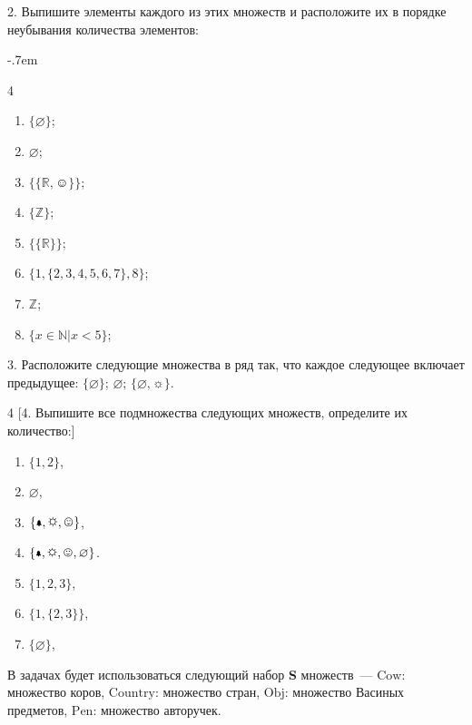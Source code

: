 \documentclass[a4paper,10pt]{article}
\begin{document}
2. Выпишите элементы каждого из этих множеств и расположите их в порядке неубывания количества элементов:\par\kern-.7em
\begin{multicols}{4}
	\begin{enumerate}[label=(\arabic*)\,]
		\item $\{\varnothing\}$;
		\item $\varnothing$;
		\item $\{\{\mathbb R, \smiley\}\}$;
		\item $\{\mathbb Z\}$;
		\item $\{\{\mathbb R\}\}$;
		\item $\{1,\{2,3,4,5,6,7\},8\}$;
		\item $\mathbb Z$;
		\item $\{x\in\mathbb N|x<5\}$;
	\end{enumerate}
\end{multicols}

3. Расположите следующие множества в ряд так, что каждое следующее включает предыдущее: $\{\varnothing\}$; $\varnothing$; $\{\varnothing, \sun\}$.

\begin{multicols}{4}
[4. Выпишите все подмножества следующих множеств, определите их количество:]
	\begin{enumerate}[label=(\arabic*)\,]
		\item $\{1,2\}$, 
		\item $\varnothing$, 
		\item $\{\bell,\sun,\smiley\}$, 
		\item $\{\bell,\sun,\smiley, \varnothing\}$.
		\item $\{1,2,3\}$, 
		\item $\{1,\{2,3\}\}$,
		\item $\{\varnothing\}$, 
	\end{enumerate}
\end{multicols}

В задачах будет использоваться следующий набор \textbf S множеств~---
$\mathrm{Cow}$: множество коров,
$\mathrm{Country}$: множество стран,
$\mathrm{Obj}$: множество Васиных предметов,
$\mathrm{Pen}$: множество авторучек.
\end{document}
